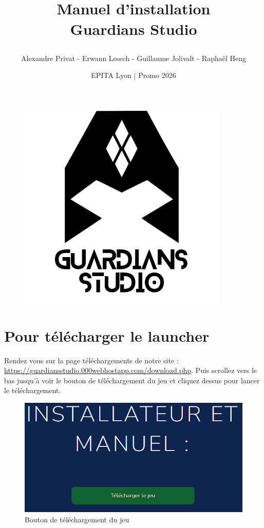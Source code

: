 \documentclass[a4paper, 10pt]{article}
\title{
	\hrulefill
	\\
	Manuel d'installation
	\\
	\textbf{Guardians Studio} \\
	\hrulefill

}
\author{Alexandre Privat - Erwann Lesech - Guillaume Jolivalt - Raphaël Heng}
\date{EPITA Lyon $|$ Promo 2026}
\begin{document}
	\maketitle
	\begin{figure}[ht]
		\centering
		\includegraphics[width=10cm, height=10cm]{images/logo.png}
	\end{figure}
	\tableofcontents
	
	\clearpage
	
	\section{Pour télécharger le launcher}
	Rendez vous sur la page téléchargements de notre site :
	\url{https://guardiansstudio.000webhostapp.com/download.php}.
	Puis scrollez vers le bas jusqu'à voir le bouton de téléchargement du jeu et cliquez dessus pour lancer le téléchargement.
	
	\begin{figure}[ht]
		\centering
		\includegraphics[scale=0.6]{images/download_launcher.png}
		\caption{Bouton de téléchargement du jeu}
	\end{figure}
	
\end{document}
